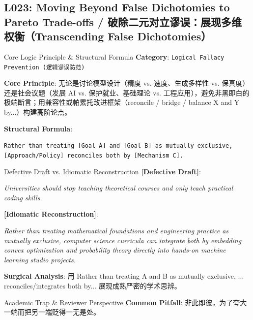 \subsection{L023: Moving Beyond False Dichotomies to Pareto Trade-offs / 破除二元对立谬误：展现多维权衡（Transcending False Dichotomies）}\label{sec:logic:L023}
\begin{ConceptBox}{Core Logic Principle \& Structural Formula}
\textbf{Category}: \texttt{Logical Fallacy Prevention (逻辑谬误防范)}\par\vspace{3pt}
\textbf{Core Principle}: 无论是讨论模型设计（精度 vs. 速度、生成多样性 vs. 保真度）还是社会议题（发展 AI vs. 保护就业、基础理论 vs. 工程应用），避免非黑即白的极端断言；用兼容性或帕累托改进框架（reconcile / bridge / balance X and Y by...）构建高阶论点。\par\vspace{4pt}
\textbf{Structural Formula}:\par\noindent\texttt{Rather than treating [Goal A] and [Goal B] as mutually exclusive, [Approach/Policy] reconciles both by [Mechanism C].}
\end{ConceptBox}
\begin{ExampleBox}{Defective Draft vs. Idiomatic Reconstruction}
\textbf{\color{TargetHighlight}[Defective Draft]}:\par\textit{Universities should stop teaching theoretical courses and only teach practical coding skills.}\par\vspace{4pt}
\textbf{\color{AcadNavy}[Idiomatic Reconstruction]}:\par\textit{Rather than treating mathematical foundations and engineering practice as mutually exclusive, computer science curricula can integrate both by embedding convex optimization and probability theory directly into hands-on machine learning studio projects.}\par\vspace{4pt}
\textbf{Surgical Analysis}: 用 Rather than treating A and B as mutually exclusive, ... reconciles/integrates both by... 展现成熟严密的学术思辨。
\end{ExampleBox}
\begin{TipBox}{Academic Trap \& Reviewer Perspective}
\textbf{Common Pitfall}: 非此即彼，为了夸大一端而把另一端贬得一无是处。
\end{TipBox}
\vspace{6pt}
